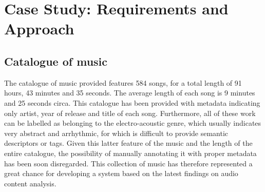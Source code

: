 \chapter{Case Study: Requirements and Approach} %

\label{Chapter4} %


\section{Catalogue of music}
\label{sec:catalogue}
The catalogue of music provided features 584 songs, for a total length of 91 hours, 43 minutes and 35 seconds. The average length of each song is 9 minutes and 25 seconds circa. This catalogue has been provided with metadata indicating only artist, year of release and title of each song. Furthermore, all of these work can be labelled as belonging to the electro-acoustic genre, which usually indicates very abstract and arrhythmic, for which is difficult to provide semantic descriptors or tags. Given this latter feature of the music and the length of the entire catalogue, the possibility of manually annotating it with proper metadata has been soon disregarded. This collection of music has therefore represented a great chance for developing a system based on the latest findings on audio content analysis.

